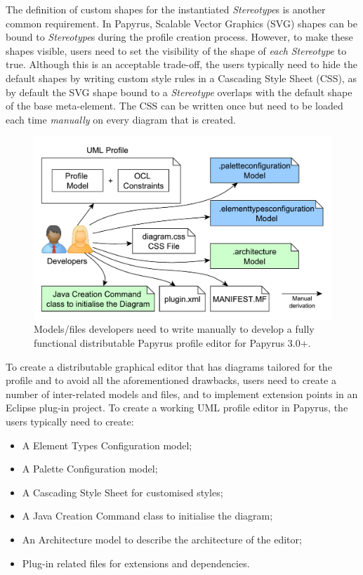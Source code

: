 The definition of custom shapes for the instantiated \textit{Stereotype}s is another common requirement. 
In Papyrus, Scalable Vector Graphics (SVG) shapes can be bound to \textit{Stereotype}s during the profile creation process. 
However, to make these shapes visible, users need to set the visibility of the shape of \textit{each} \textit{Stereotype} to true. 
Although this is an acceptable trade-off, the users typically need to hide the default shapes by writing custom style rules in a Cascading Style Sheet (CSS), as by default the SVG shape bound to a \textit{Stereotype} overlaps with the default shape of the base meta-element.
The CSS can be written once but need to be loaded each time \textit{manually} on every diagram that is created. 

\begin{figure}[ht!]
	\centering
	\includegraphics[width=1\textwidth]{diagrams/neededPapyrusFiles_new.pdf}
	\vspace{-3mm}
	\caption[]{Models/files developers need to write manually to 
		develop a fully functional distributable Papyrus profile editor for Papyrus 3.0+.}
	\label{fig:neededPapyrusFiles_new}

\end{figure}

To create a distributable graphical editor that has diagrams tailored for the profile and to avoid all the aforementioned drawbacks, users need to create a number of inter-related models and files, and to implement extension points in an Eclipse plug-in project. 
To create a working UML profile editor in Papyrus, the users typically need to create:
\begin{itemize}
	\item A Element Types Configuration model;
	\item A Palette Configuration model;
	\item A Cascading Style Sheet for customised styles;
	\item A Java Creation Command class to initialise the diagram;
	\item An Architecture model to describe the architecture of the editor;
	\item Plug-in related files for extensions and dependencies.
\end{itemize}

